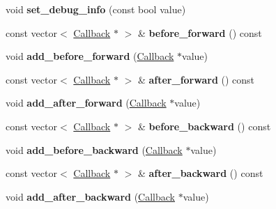 \begin{DoxyCompactItemize}
\item 
\mbox{\label{classcaffe_1_1_net_a5b43ec32a7940703ecc3d0fa80bb2f91}} 
void {\bfseries set\+\_\+debug\+\_\+info} (const bool value)
\item 
\mbox{\label{classcaffe_1_1_net_a29cac2b39bbfcf0891d34deecdb4f2a9}} 
const vector$<$ \mbox{\hyperlink{classcaffe_1_1_net_1_1_callback}{Callback}} $\ast$ $>$ \& {\bfseries before\+\_\+forward} () const
\item 
\mbox{\label{classcaffe_1_1_net_ab38efc0662826a18034817b484ea0b88}} 
void {\bfseries add\+\_\+before\+\_\+forward} (\mbox{\hyperlink{classcaffe_1_1_net_1_1_callback}{Callback}} $\ast$value)
\item 
\mbox{\label{classcaffe_1_1_net_a262da4bf0282c2e8615d3bd0b3582991}} 
const vector$<$ \mbox{\hyperlink{classcaffe_1_1_net_1_1_callback}{Callback}} $\ast$ $>$ \& {\bfseries after\+\_\+forward} () const
\item 
\mbox{\label{classcaffe_1_1_net_a27f0234629c0131b23c577713bb8209e}} 
void {\bfseries add\+\_\+after\+\_\+forward} (\mbox{\hyperlink{classcaffe_1_1_net_1_1_callback}{Callback}} $\ast$value)
\item 
\mbox{\label{classcaffe_1_1_net_a56eb610394b69214ff9e4d6672c307bb}} 
const vector$<$ \mbox{\hyperlink{classcaffe_1_1_net_1_1_callback}{Callback}} $\ast$ $>$ \& {\bfseries before\+\_\+backward} () const
\item 
\mbox{\label{classcaffe_1_1_net_aed8cfa1dd96bef7fc39c232623995687}} 
void {\bfseries add\+\_\+before\+\_\+backward} (\mbox{\hyperlink{classcaffe_1_1_net_1_1_callback}{Callback}} $\ast$value)
\item 
\mbox{\label{classcaffe_1_1_net_a331192ceb7cebfbe83177d00e98c67cc}} 
const vector$<$ \mbox{\hyperlink{classcaffe_1_1_net_1_1_callback}{Callback}} $\ast$ $>$ \& {\bfseries after\+\_\+backward} () const
\item 
\mbox{\label{classcaffe_1_1_net_a29a94f00de415c11ee57b0985c255827}} 
void {\bfseries add\+\_\+after\+\_\+backward} (\mbox{\hyperlink{classcaffe_1_1_net_1_1_callback}{Callback}} $\ast$value)
\end{DoxyCompactItemize}
